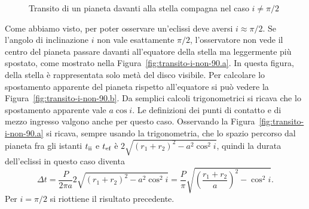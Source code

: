 \begin{figure}
  \centering
   \qquad
  \caption{Transito di un pianeta davanti alla stella compagna nel caso
    $i \neq \pi/2$}
  \label{fig:transito-i-non-90}
\end{figure}
Come abbiamo visto, per poter osservare un'eclissi deve aversi $i \approx
\pi/2$. Se l'angolo di inclinazione $i$ non vale esattamente $\pi/2$,
l'osservatore non vede il centro del pianeta passare davanti all'equatore della
stella ma leggermente più spostato, come mostrato nella
Figura~\ref{fig:transito-i-non-90.a}. In questa figura, della stella è
rappresentata solo metà del disco visibile. Per calcolare lo spostamento
apparente del pianeta rispetto all'equatore si può vedere la
Figura~\ref{fig:transito-i-non-90.b}. Da semplici calcoli trigonometrici si
ricava che lo spostamento apparente vale $a \cos i$. Le definizioni dei punti di
contatto e di mezzo ingresso valgono anche per questo caso. Osservando la
Figura~\ref{fig:transito-i-non-90.a} si ricava, sempre usando la trigonometria,
che lo spazio percorso dal pianeta fra gli istanti $t_{\textup{ii}}$ e
$t_{\textup{ef}}$ è $2\sqrt{(r_1 + r_2)^2 - a^2\cos^2 i}$, quindi la durata
dell'eclissi in questo caso diventa
\begin{equation}
  \Delta t = \frac{P}{2\pi a} 2\sqrt{(r_1 + r_2)^2 - a^2\cos^2 i} =
  \frac{P}{\pi} \sqrt{\left(\frac{r_1 + r_2}{a}\right)^2 - \cos^2 i}.
\end{equation}
Per $i = \pi/2$ si riottiene il risultato precedente.

